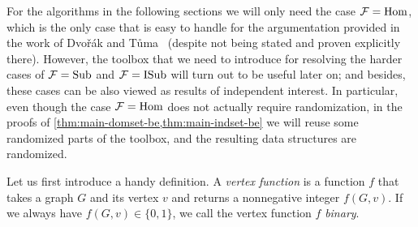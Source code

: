 For the algorithms in the following sections we will only need the case $\mathcal{F} = \mathrm{Hom}$, which is the only case that is easy to handle for the argumentation provided in the work of Dvo\v{r}\'ak and T\r{u}ma~\cite{DvorakT13} (despite not being stated and proven explicitly there). However, the toolbox that we need to introduce for resolving the harder cases of $\mathcal{F} = \mathrm{Sub}$ and $\mathcal{F} = \mathrm{ISub}$ will turn out to be useful later on; and besides, these cases can be also viewed as results of independent interest. In particular, even though the case $\mathcal{F}=\mathrm{Hom}$ does not actually require randomization, in the proofs of \cref{thm:main-domset-be,thm:main-indset-be} we will reuse some randomized parts of the toolbox, and the resulting data structures are randomized.


Let us first introduce a handy definition. A \emph{vertex function} is a function $f$ that takes a graph $G$ and its vertex $v$ and returns a nonnegative integer $f(G,v)$. If we always have $f(G,v)\in \{0,1\}$, we call the vertex function $f$ \emph{binary}. 

